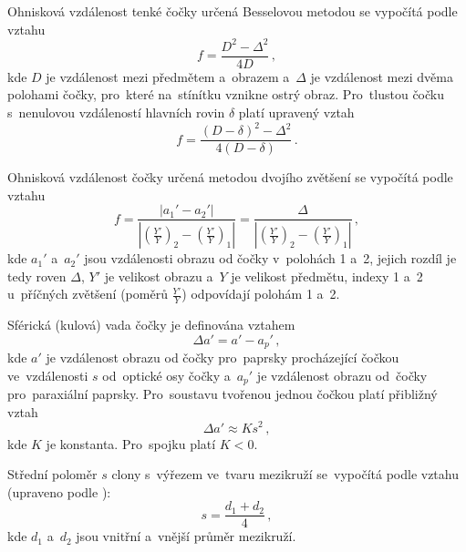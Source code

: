 \documentclass{../concepts/titul_zprava_p/prepareprotokolZprava} %
\begin{document}
Ohnisková vzdálenost tenké čočky určená Besselovou metodou se vypočítá podle vztahu \cite{studijni}
\begin{equation}
    \label{eq:bessel}
    f = \frac{D^2 - \Delta^2}{4 D} \,,
\end{equation}
kde $D$ je vzdálenost mezi předmětem a~obrazem a~$\Delta$ je vzdálenost mezi dvěma polohami čočky, pro~které na~stínítku vznikne
ostrý obraz. Pro~tlustou čočku s~nenulovou vzdáleností hlavních rovin $\delta$ platí upravený vztah \cite{studijni}
\begin{equation}
    \label{eq:bessel_tlusta}
    f = \frac{\left(D-\delta\right)^2 - \Delta^2}{4 \left(D - \delta\right)}\,.
\end{equation}

Ohnisková vzdálenost čočky určená metodou dvojího zvětšení se vypočítá podle vztahu \cite{studijni}
\begin{equation}
    \label{eq:dvoji_zvetseni}
    f = \frac{\left| a_1' - a_2' \right|}{\left| \left(\frac{Y'}{Y}\right)_2 - \left(\frac{Y'}{Y}\right)_1 \right|} = 
    \frac{\Delta}{\left| \left(\frac{Y'}{Y}\right)_2 - \left(\frac{Y'}{Y}\right)_1 \right|}\,,
\end{equation}
kde $a_1'$ a~$a_2'$ jsou vzdálenosti obrazu od čočky v~polohách 1 a~2, jejich rozdíl je tedy roven $\Delta$, $Y'$ je 
velikost obrazu a~$Y$ je velikost předmětu,
indexy 1 a~2 u~příčných zvětšení (poměrů $\frac{Y'}{Y}$) odpovídají polohám 1 a~2.

Sférická (kulová) vada čočky je definována vztahem \cite{studijni}
\begin{equation}
    \label{eq:kulova_vada_definice}
    \Delta a' = a' - a_p' \,,
\end{equation}
kde $a'$ je vzdálenost obrazu od čočky pro~paprsky procházející čočkou ve~vzdálenosti $s$ od~optické osy čočky a~$a_p'$
je vzdálenost obrazu od~čočky pro~paraxiální paprsky.
Pro~soustavu tvořenou jednou čočkou platí přibližný vztah \cite{studijni}
\begin{equation}
    \label{eq:kulova_vada_na_s}
    \Delta a' \approx K s^2 \,,
\end{equation}
kde $K$ je konstanta. Pro~spojku platí $K < 0$.

Střední poloměr $s$ clony s~výřezem ve~tvaru mezikruží se~vypočítá podle vztahu (upraveno podle \cite{studijni}):
\begin{equation}
    \label{eq:stredni_polomer_mezikruzi}
    s = \frac{d_1 + d_2}{4} \,,
\end{equation}
kde $d_1$ a~$d_2$ jsou vnitřní a~vnější průměr mezikruží.
\end{document}
